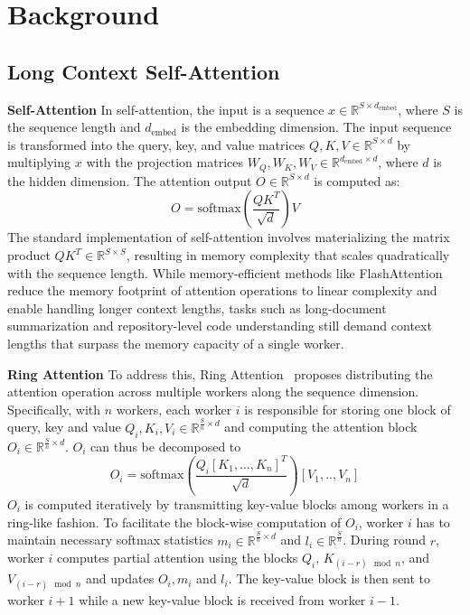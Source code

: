 \section{Background}
\subsection{Long Context Self-Attention}
\textbf{Self-Attention} In self-attention, the input is a sequence $x \in \mathbb{R}^{S \times d_{\text{embed}}}$, where $S$ is the sequence length and $d_{\text{embed}}$ is the embedding dimension. The input sequence is transformed into the query, key, and value matrices $Q, K, V \in \mathbb{R}^{S \times d}$ by multiplying $x$ with the projection matrices $W_Q, W_K, W_V \in \mathbb{R}^{d_{\text{embed}} \times d}$, where $d$ is the hidden dimension. The attention output $O \in \mathbb{R}^{S \times d}$ is computed as:
\begin{equation} \label{eqn:attn}
  O = \text{softmax}(\frac{QK^T}{\sqrt{d}})V
\end{equation}
The standard implementation of self-attention involves materializing the matrix product $QK^T \in \mathbb{R}^{S \times S}$, resulting in memory complexity that scales quadratically with the sequence length. While memory-efficient methods like FlashAttention~\cite{dao2022fa, dao2023fa2} reduce the memory footprint of attention operations to linear complexity and enable handling longer context lengths, tasks such as long-document summarization and repository-level code understanding still demand context lengths that surpass the memory capacity of a single worker.

\textbf{Ring Attention} To address this, Ring Attention~\cite{liu2024ring} proposes distributing the attention operation across multiple workers along the sequence dimension. Specifically, with $n$ workers, each worker $i$ is responsible for storing one block of query, key and value $Q_i, K_i, V_i \in \mathbb{R}^{\frac{S}{n} \times d}$ and computing the attention block $O_i \in \mathbb{R}^{\frac{S}{n} \times d}$. $O_i$ can thus be decomposed to
\begin{equation} \label{eqn:ring-attn}
  O_i = \text{softmax}(\frac{Q_i[K_1, ..., K_n]^T}{\sqrt{d}})[V_1, .., V_n]
\end{equation}
$O_i$ is computed iteratively by transmitting key-value blocks among workers in a ring-like fashion. To facilitate the block-wise computation of $O_i$, worker $i$ has to maintain necessary softmax statistics $m_i \in \mathbb{R}^{\frac{S}{n} \times d}$ and $l_i \in \mathbb{R}^{\frac{S}{n}}$. During round $r$, worker $i$ computes partial attention using the blocks $Q_i$, $K_{(i-r) \mod n}$, and $V_{(i-r) \mod n}$ and updates $O_i, m_i$ and $l_i$. The key-value block is then sent to worker $i+1$ while a new key-value block is received from worker $i-1$.

